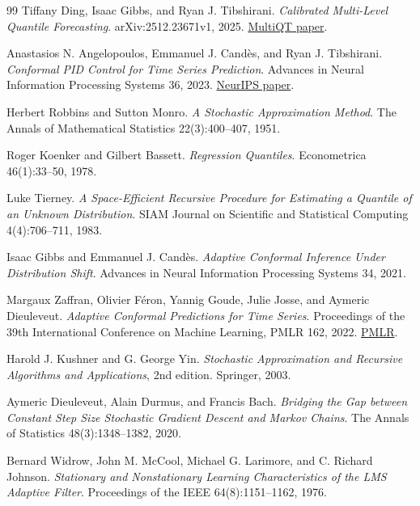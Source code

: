\documentclass[11pt,a4paper]{article}
\theoremstyle{definition}
\theoremstyle{remark}
\begin{document}
\begin{thebibliography}{99}
Tiffany Ding, Isaac Gibbs, and Ryan J. Tibshirani.
\emph{Calibrated Multi-Level Quantile Forecasting}.
arXiv:2512.23671v1, 2025.
\href{https://arxiv.org/abs/2512.23671v1}{MultiQT paper}.

Anastasios N. Angelopoulos, Emmanuel J. Cand\`es, and Ryan J. Tibshirani.
\emph{Conformal PID Control for Time Series Prediction}.
Advances in Neural Information Processing Systems 36, 2023.
\href{https://proceedings.neurips.cc/paper_files/paper/2023/file/47f2fad8c1111d07f83c91be7870f8db-Paper-Conference.pdf}{NeurIPS paper}.

Herbert Robbins and Sutton Monro.
\emph{A Stochastic Approximation Method}.
The Annals of Mathematical Statistics 22(3):400--407, 1951.

Roger Koenker and Gilbert Bassett.
\emph{Regression Quantiles}.
Econometrica 46(1):33--50, 1978.

Luke Tierney.
\emph{A Space-Efficient Recursive Procedure for Estimating a Quantile of an
Unknown Distribution}.
SIAM Journal on Scientific and Statistical Computing 4(4):706--711, 1983.

Isaac Gibbs and Emmanuel J. Cand\`es.
\emph{Adaptive Conformal Inference Under Distribution Shift}.
Advances in Neural Information Processing Systems 34, 2021.

Margaux Zaffran, Olivier F\'eron, Yannig Goude, Julie Josse, and Aymeric
Dieuleveut.
\emph{Adaptive Conformal Predictions for Time Series}.
Proceedings of the 39th International Conference on Machine Learning,
PMLR 162, 2022.
\href{https://proceedings.mlr.press/v162/zaffran22a.html}{PMLR}.

Harold J. Kushner and G. George Yin.
\emph{Stochastic Approximation and Recursive Algorithms and Applications},
2nd edition. Springer, 2003.

Aymeric Dieuleveut, Alain Durmus, and Francis Bach.
\emph{Bridging the Gap between Constant Step Size Stochastic Gradient
Descent and Markov Chains}.
The Annals of Statistics 48(3):1348--1382, 2020.

Bernard Widrow, John M. McCool, Michael G. Larimore, and C. Richard Johnson.
\emph{Stationary and Nonstationary Learning Characteristics of the LMS
Adaptive Filter}.
Proceedings of the IEEE 64(8):1151--1162, 1976.


\end{thebibliography}
\end{document}
